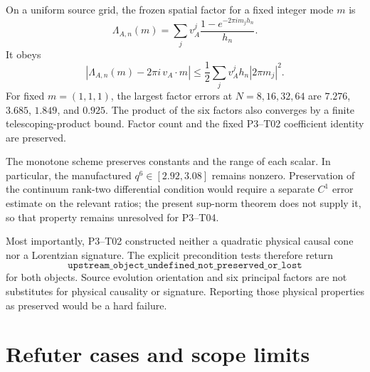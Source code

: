 \documentclass[11pt]{article}
\begin{document}
On a uniform source grid, the frozen spatial factor for a fixed integer mode
$m$ is
\begin{equation}
 \Lambda_{A,n}(m)=\sum_jv_A^j\frac{1-e^{-2\pi i m_jh_n}}{h_n}.
 \label{eq:discretesymbol}
\end{equation}
It obeys
\begin{equation}
 |\Lambda_{A,n}(m)-2\pi i\,v_A\cdot m|
 \le\frac12\sum_jv_A^jh_n|2\pi m_j|^2.
 \label{eq:symbolbound}
\end{equation}
For fixed $m=(1,1,1)$, the largest factor errors at
$N=8,16,32,64$ are $7.276$, $3.685$, $1.849$, and $0.925$.  The product of
the six factors also converges by a finite telescoping-product bound.  Factor
count and the fixed P3--T02 coefficient identity are preserved.

The monotone scheme preserves constants and the range of each scalar.  In
particular, the manufactured $q^6\in[2.92,3.08]$ remains nonzero.  Preservation
of the continuum rank-two differential condition would require a separate
$C^1$ error estimate on the relevant ratios; the present sup-norm theorem does
not supply it, so that property remains unresolved for P3--T04.

Most importantly, P3--T02 constructed neither a quadratic physical causal
cone nor a Lorentzian signature.  The explicit precondition tests therefore
return
\begin{equation}
 \texttt{upstream\_object\_undefined\_not\_preserved\_or\_lost}
 \label{eq:undefinedproperties}
\end{equation}
for both objects.  Source evolution orientation and six principal factors are
not substitutes for physical causality or signature.  Reporting those
physical properties as preserved would be a hard failure.

\section{Refuter cases and scope limits}
\end{document}
